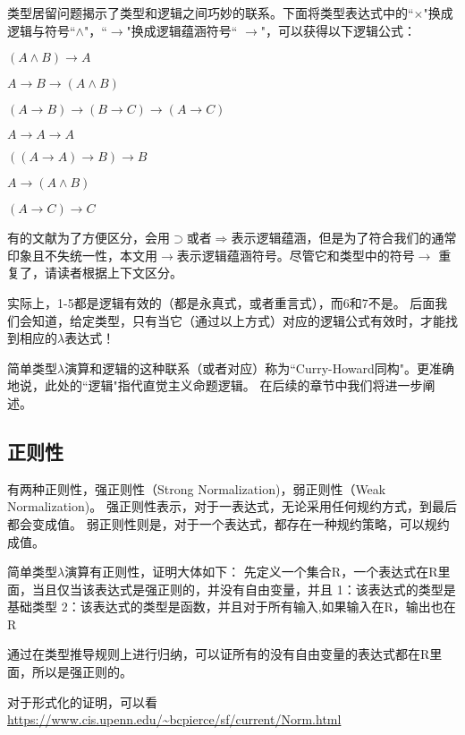 类型居留问题揭示了类型和逻辑之间巧妙的联系。下面将类型表达式中的``$\times$"换成逻辑与符号``$\land$"，``$\to$"换成逻辑蕴涵符号`` $\to$"，可以获得以下逻辑公式：

\begin{tightenum}
  \item $( A \land B) \to A$
  \item $A \to B \to (A \land B)$
  \item $(A \to B) \to (B \to C) \to (A \to C)$
  \item $A \to A \to A$
  \item $((A \to A) \to B) \to B$
  \item $A \to (A \land B)$
  \item $(A \to C) \to C$
\end{tightenum}

\begin{rem}
有的文献为了方便区分，会用$\supset$或者$\Rightarrow$表示逻辑蕴涵，但是为了符合我们的通常印象且不失统一性，本文用$\to$表示逻辑蕴涵符号。尽管它和类型中的符号$\to$ 重复了，请读者根据上下文区分。
\end{rem}

实际上，1-5都是逻辑有效的（都是永真式，或者重言式），而6和7不是。
后面我们会知道，给定类型，只有当它（通过以上方式）对应的逻辑公式有效时，才能找到相应的$\lambda$表达式！

简单类型$\lambda$演算和逻辑的这种联系（或者对应）称为``Curry-Howard同构"。更准确地说，此处的``逻辑"指代直觉主义命题逻辑。 在后续的章节中我们将进一步阐述。


\subsection{正则性}

有两种正则性，强正则性（Strong Normalization)，弱正则性（Weak  Normalization)。
强正则性表示，对于一表达式，无论采用任何规约方式，到最后都会变成值。
弱正则性则是，对于一个表达式，都存在一种规约策略，可以规约成值。

简单类型$\lambda$演算有正则性，证明大体如下：
先定义一个集合R，一个表达式在R里面，当且仅当该表达式是强正则的，并没有自由变量，并且
1：该表达式的类型是基础类型
2：该表达式的类型是函数，并且对于所有输入,如果输入在R，输出也在R

通过在类型推导规则上进行归纳，可以证所有的没有自由变量的表达式都在R里面，所以是强正则的。

对于形式化的证明，可以看 \url {https://www.cis.upenn.edu/~bcpierce/sf/current/Norm.html}